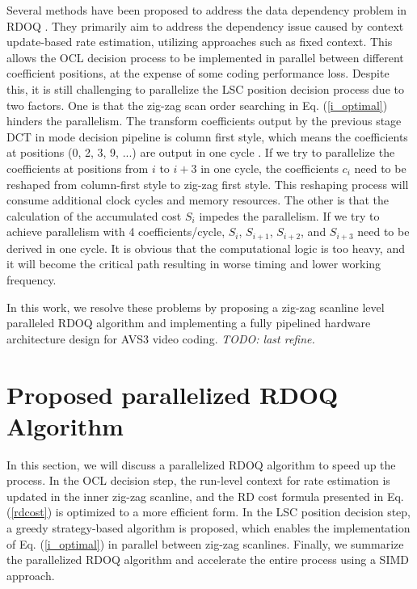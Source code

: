 \documentclass[lettersize,journal]{IEEEtran}
\begin{document}
Several methods have been proposed to address the data dependency problem in RDOQ \cite{igarashi2018parallelGPU,xu2022hardwarefriendlyforrdoq,zhao2023scanline}. They primarily aim to address the dependency issue caused by context update-based rate estimation, utilizing approaches such as fixed context. This allows the OCL decision process to be implemented in parallel between different coefficient positions, at the expense of some coding performance loss. Despite this, it is still challenging to parallelize the LSC position decision process due to two factors. One is that the zig-zag scan order searching in Eq. (\ref{i_optimal}) hinders the parallelism. The transform coefficients output by the previous stage DCT in mode decision pipeline is column first style, which means the coefficients at positions (0, 2, 3, 9, ...) are output in one cycle \cite{fan2019pipelined}. If we try to parallelize the coefficients at positions from $i$ to $i+3$ in one cycle, the coefficients $c_i$ need to be reshaped from column-first style to zig-zag first style. This reshaping process will consume additional clock cycles and memory resources. The other is that the calculation of the accumulated cost $S_{i}$ impedes the parallelism. If we try to achieve parallelism with 4 coefficients/cycle, $S_{i}$, $S_{i+1}$, $S_{i+2}$, and $S_{i+3}$ need to be derived in one cycle. It is obvious that the computational logic is too heavy, and it will become the critical path resulting in worse timing and lower working frequency. 

In this work, we resolve these problems by proposing a zig-zag scanline level paralleled RDOQ algorithm and implementing a fully pipelined hardware architecture design for AVS3 video coding. \emph{TODO: last refine.}

\section{Proposed parallelized RDOQ Algorithm}
\label{sec:3}
In this section, we will discuss a parallelized RDOQ algorithm to speed up the process. In the OCL decision step, the run-level context for rate estimation is updated in the inner zig-zag scanline, and the RD cost formula presented in Eq. (\ref{rdcost}) is optimized to a more efficient form. In the LSC position decision step, a greedy strategy-based algorithm is proposed, which enables the implementation of Eq. (\ref{i_optimal}) in parallel between zig-zag scanlines. Finally, we summarize the parallelized RDOQ algorithm and accelerate the entire process using a SIMD approach. 
\end{document}
